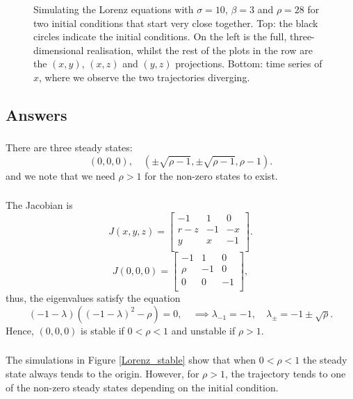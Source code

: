 \documentclass[]{article}
\newcommand{\bb}{\begin{equation}}
\newcommand{\ee}{\end{equation}}
\newcommand{\fig}[1]{Figure \ref{#1}}
\newcommand{\tp}{\textwidth}
\begin{document}
\begin{figure}[h!!!tb]
\centering
{}
\caption{\label{Lorenz_chaotic} Simulating the Lorenz equations with $\sigma=10$, $\beta=3$ and $\rho=28$ for two initial conditions that start very close together. Top: the black circles indicate the initial conditions. On the left is the full, three-dimensional realisation, whilst the rest of the plots in the row are the $(x,y)$, $(x,z)$ and $(y,z)$ projections. Bottom: time series of $x$, where we observe the two trajectories diverging.}
\end{figure}
\begin{Answ}
\subsection{Answers}
\subsubsection{}
There are three steady states:
\bb
(0,0,0), \quad(\pm\sqrt{\rho-1},\pm\sqrt{\rho-1},\rho-1).
\ee
and we note that we need $\rho>1$ for the non-zero states to exist.
\subsubsection{}
The Jacobian is
\bb
J(x,y,z)=\left[ {\begin{array}{ccc}
   -1 & 1 & 0 \\
   r-z & -1 & -x \\
   y  & x & -1 \\
  \end{array} } \right].
\ee
\bb
J(0,0,0)=\left[ {\begin{array}{ccc}
   -1 & 1 & 0 \\
   \rho & -1 & 0 \\
   0 & 0 & -1 \\
  \end{array} } \right],
\ee
thus, the eigenvalues satisfy the equation
\bb
(-1-\lambda)((-1-\lambda)^2-\rho)=0,\quad \implies\lambda_{-1}=-1,\quad\lambda_{\pm}=-1\pm\sqrt{\rho}.
\ee
Hence, $(0,0,0)$ is stable if $0<\rho<1$ and unstable if $\rho>1$.
\subsubsection{}
The simulations in \fig{Lorenz_stable} show that when $0<\rho<1$ the steady state always tends to the origin. However, for $\rho>1$, the trajectory tends to one of the non-zero steady states depending on the initial condition.




\end{Answ}
\end{document}
